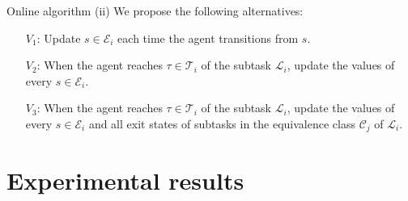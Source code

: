 \documentclass{beamer}
\theoremstyle{mystyle}
\newcommand{\cC}{\mathcal{C}}
\newcommand{\cE}{\mathcal{E}}
\newcommand{\cL}{\mathcal{L}}
\newcommand{\cT}{\mathcal{T}}
\begin{document}
\begin{frame}{Online algorithm (ii)}
We propose the following alternatives:
\begin{itemize}
\item[$V_1$:] Update $s\in\cE_i$ each time the agent transitions from $s$.
\item[$V_2$:] When the agent reaches $\tau \in \cT_i$ of the subtask $\cL_i$, update the values of every $s \in \cE_i$.
\item[$V_3$:] When the agent reaches $\tau \in \cT_i$ of the subtask $\cL_i$, update the values of every $s \in \cE_i$ and all exit states of subtasks in the equivalence class $\cC_j$ of $\cL_i$.
\end{itemize}


    
\end{frame}



\section{Experimental results}
%
%
%
%
%    
\end{document}
